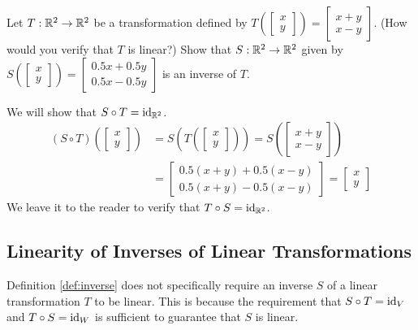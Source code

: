 \documentclass{ximera}
\begin{document}
\begin{example}\label{ex:inverseverify} Let $T:\mathbb{R}^2\rightarrow \mathbb{R}^2$ be a transformation defined by $T\left(\begin{bmatrix}x\\y\end{bmatrix}\right)=\begin{bmatrix}x+y\\x-y\end{bmatrix}$. (How would you verify that $T$ is linear?)  Show that $S:\mathbb{R}^2\rightarrow \mathbb{R}^2$ given by $S\left(\begin{bmatrix}x\\y\end{bmatrix}\right)=\begin{bmatrix}0.5x+0.5y\\0.5x-0.5y\end{bmatrix}$ is an inverse of $T$.
\begin{explanation}
We will show that $S\circ T=\text{id}_{\mathbb{R}^2}$.  
\begin{align*}
(S\circ T)\left(\begin{bmatrix}x\\y\end{bmatrix}\right)&=S\left(T\left(\begin{bmatrix}x\\y\end{bmatrix}\right)\right)=S\left(\begin{bmatrix}x+y\\x-y\end{bmatrix}\right)\\
&=\begin{bmatrix}0.5(x+y)+0.5(x-y)\\0.5(x+y)-0.5(x-y)\end{bmatrix}
=\begin{bmatrix}x\\y\end{bmatrix}
\end{align*}
We leave it to the reader to verify that $T\circ S=\text{id}_{\mathbb{R}^2}$.

\end{explanation}
\end{example}

\subsection*{Linearity of Inverses of Linear Transformations}

Definition \ref{def:inverse} does not specifically require an inverse $S$ of a linear transformation $T$ to be linear.  This is because the requirement that $S\circ T=\text{id}_V$ and $T\circ S=\text{id}_W$ is sufficient to guarantee that $S$ is linear.  
\end{document}
